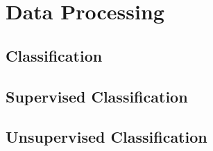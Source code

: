 \section{Data Processing}

\subsection{Classification}

\subsection{Supervised Classification}

\subsection{Unsupervised Classification}
